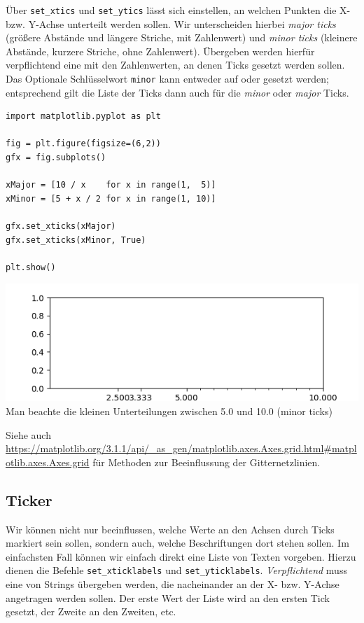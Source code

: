 Über \texttt{set\_xtics} und \texttt{set\_ytics} lässt sich einstellen, an welchen Punkten die X- bzw. Y-Achse unterteilt werden sollen. Wir unterscheiden hierbei \emph{major ticks} (größere Abstände und längere Striche, \idR mit Zahlenwert) und \emph{minor ticks} (kleinere Abstände, kurzere Striche, \idR ohne Zahlenwert). Übergeben werden hierfür verpflichtend eine  mit den Zahlenwerten, an denen Ticks gesetzt werden sollen. Das Optionale Schlüsselwort \texttt{minor} kann entweder auf  oder  gesetzt werden; entsprechend gilt die Liste der Ticks dann auch für die \emph{minor} oder \emph{major} Ticks.

\begin{codebox}[Beispiel: Major- und Minor Ticks, width=.55\linewidth, nobeforeafter, equal height group = grpXmpSimpleTicks]
\begin{verbatim}
import matplotlib.pyplot as plt

fig = plt.figure(figsize=(6,2))
gfx = fig.subplots()

xMajor = [10 / x    for x in range(1,  5)]
xMinor = [5 + x / 2 for x in range(1, 10)]

gfx.set_xticks(xMajor)
gfx.set_xticks(xMinor, True)

plt.show()
\end{verbatim}
\end{codebox}
%
\begin{tcolorbox}[title=Ausgabe: Major- und Minor Ticks, width=.45\linewidth, nobeforeafter, equal height group = grpXmpSimpleTicks]
	\includegraphics[width=\linewidth]{./gfx/plt-ticks}
	Man beachte die kleinen Unterteilungen zwischen 5.0 und 10.0 (minor ticks)
\end{tcolorbox}

Siehe auch \url{https://matplotlib.org/3.1.1/api/_as_gen/matplotlib.axes.Axes.grid.html#matplotlib.axes.Axes.grid} für Methoden zur Beeinflussung der Gitternetzlinien.

\subsection{Ticker}
Wir können nicht nur beeinflussen, welche Werte an den Achsen durch Ticks markiert sein sollen, sondern auch, welche Beschriftungen dort stehen sollen. Im einfachsten Fall können wir einfach direkt eine Liste von Texten vorgeben. Hierzu dienen die Befehle \texttt{set\_xticklabels} und \texttt{set\_yticklabels}. \emph{Verpflichtend} muss eine  von Strings übergeben werden, die nacheinander an der X- bzw. Y-Achse angetragen werden sollen. Der erste Wert der Liste wird an den ersten Tick gesetzt, der Zweite an den Zweiten, etc.

